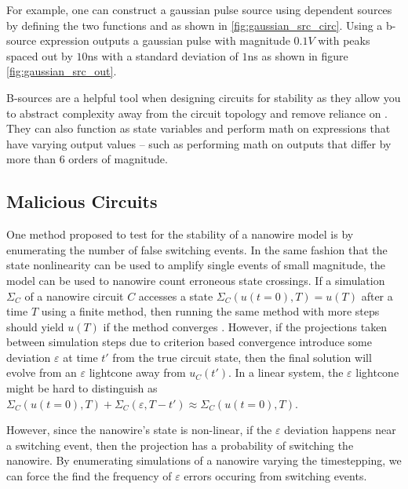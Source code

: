 For example, one can construct a gaussian pulse source using dependent sources
by defining the two functions  and  as shown in 
\ref{fig:gaussian_src_circ}.
Using a b-source expression 
outputs a gaussian pulse with magnitude $0.1V$ with peaks
spaced out by $10$ns with a standard deviation of $1$ns as shown in figure
\ref{fig:gaussian_src_out}. 

B-sources are a helpful tool when designing circuits for stability as they
allow you to abstract complexity away from the circuit topology and remove 
reliance on . They can also function as state variables and perform
math on expressions that have varying output values -- such as performing math
on outputs that differ by more than 6 orders of magnitude. 

\subsection{Malicious Circuits} \label{malicious_circuits}

One method proposed to test for the stability of a nanowire model is by enumerating
the number of false switching events. In the same fashion that the state nonlinearity
can be used to amplify single events of small magnitude, the model can be used to 
nanowire count erroneous state crossings. If a simulation $\Sigma_C$
of a nanowire circuit $C$ accesses a state $\Sigma_C( u(t=0), T ) = u(T)$ after
a time $T$ using a finite method,
then running the same method with more steps should yield $u(T)$ if the method
converges \cite{DAHLQUIST}.
However, if the projections taken between simulation steps due to criterion 
based convergence introduce some deviation $\varepsilon$ at time $t'$ from the 
true circuit state, then the final solution will evolve from an $\varepsilon$ lightcone
away from $u_C(t')$. In a linear system, the $\varepsilon$ lightcone might be hard to
distinguish as $\Sigma_C(u(t=0), T) + \Sigma_C(\varepsilon, T-t') \approx \Sigma_C(u(t=0), T)$. 

However, since the nanowire's state is non-linear, if the $\varepsilon$ deviation happens
near a switching event, then the projection has a probability of switching the 
nanowire. By enumerating simulations of a nanowire varying the timestepping,
we can force the find the frequency of $\varepsilon$ errors occuring from switching
events.

